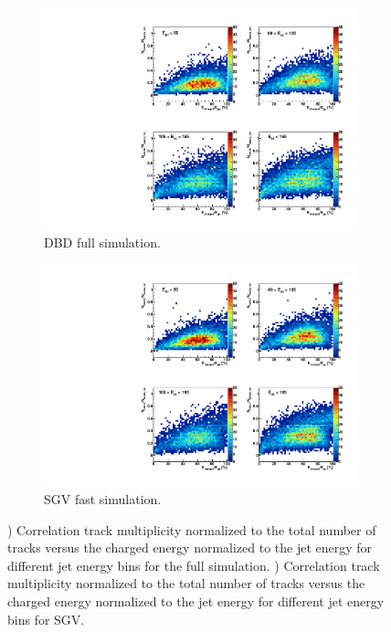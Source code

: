 \begin{figure}[htbp!]
  \centering
  \begin{subfigure}[t]{0.45\textwidth}
    \centering
    \includegraphics[width=1\linewidth]{../Thesis_Plots/SGV/Plots/Correlation_Ntrack_FracEchajet_full.pdf}
    \caption{DBD full simulation.} \label{fig:correlation_distrib_full}
  \end{subfigure}
  \hfill
  \begin{subfigure}[t]{0.45\textwidth}
    \centering
    \includegraphics[width=1\linewidth]{../Thesis_Plots/SGV/Plots/Correlation_Ntrack_FracEchajet_sgv.pdf}
    \caption{SGV fast simulation.} \label{fig:correlation_distrib_sgv}
  \end{subfigure}
  \caption{) Correlation track multiplicity normalized to the total number of tracks versus the charged energy normalized to the jet energy for different jet energy bins for the full simulation. ) Correlation track multiplicity normalized to the total number of tracks versus the charged energy normalized to the jet energy for different jet energy bins for SGV.}
\end{figure}

